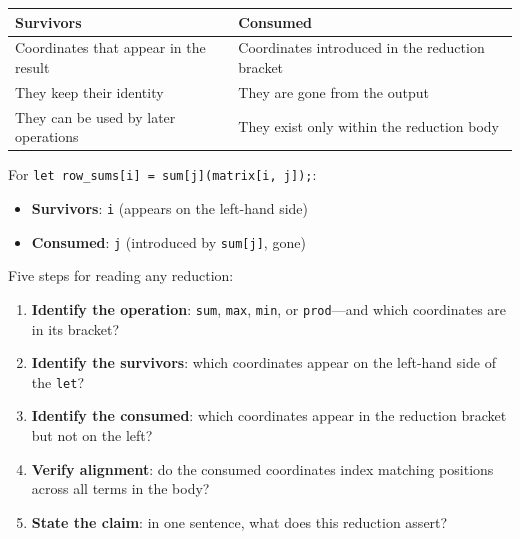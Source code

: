 \documentclass[11pt,titlepage]{article}
\providecommand{\tightlist}{%
  \setlength{\itemsep}{0pt}\setlength{\parskip}{0pt}}
\begin{document}
\begin{longtable}[]{@{}ll@{}}
\toprule
\begin{minipage}[b]{0.49\columnwidth}\raggedright
Survivors\strut
\end{minipage} & \begin{minipage}[b]{0.45\columnwidth}\raggedright
Consumed\strut
\end{minipage}\tabularnewline
\midrule
\endhead
\begin{minipage}[t]{0.49\columnwidth}\raggedright
Coordinates that appear in the result\strut
\end{minipage} & \begin{minipage}[t]{0.45\columnwidth}\raggedright
Coordinates introduced in the reduction bracket\strut
\end{minipage}\tabularnewline
\begin{minipage}[t]{0.49\columnwidth}\raggedright
They keep their identity\strut
\end{minipage} & \begin{minipage}[t]{0.45\columnwidth}\raggedright
They are gone from the output\strut
\end{minipage}\tabularnewline
\begin{minipage}[t]{0.49\columnwidth}\raggedright
They can be used by later operations\strut
\end{minipage} & \begin{minipage}[t]{0.45\columnwidth}\raggedright
They exist only within the reduction body\strut
\end{minipage}\tabularnewline
\bottomrule
\end{longtable}

For \texttt{let\ row\_sums{[}i{]}\ =\ sum{[}j{]}(matrix{[}i,\ j{]});}:

\begin{itemize}
\tightlist
\item
  \textbf{Survivors}: \texttt{i} (appears on the left-hand side)
\item
  \textbf{Consumed}: \texttt{j} (introduced by \texttt{sum{[}j{]}},
  gone)
\end{itemize}

Five steps for reading any reduction:

\begin{enumerate}
\def\labelenumi{\arabic{enumi}.}
\tightlist
\item
  \textbf{Identify the operation}: \texttt{sum}, \texttt{max},
  \texttt{min}, or \texttt{prod}---and which coordinates are in its
  bracket?
\item
  \textbf{Identify the survivors}: which coordinates appear on the
  left-hand side of the \texttt{let}?
\item
  \textbf{Identify the consumed}: which coordinates appear in the
  reduction bracket but not on the left?
\item
  \textbf{Verify alignment}: do the consumed coordinates index matching
  positions across all terms in the body?
\item
  \textbf{State the claim}: in one sentence, what does this reduction
  assert?
\end{enumerate}
\end{document}
